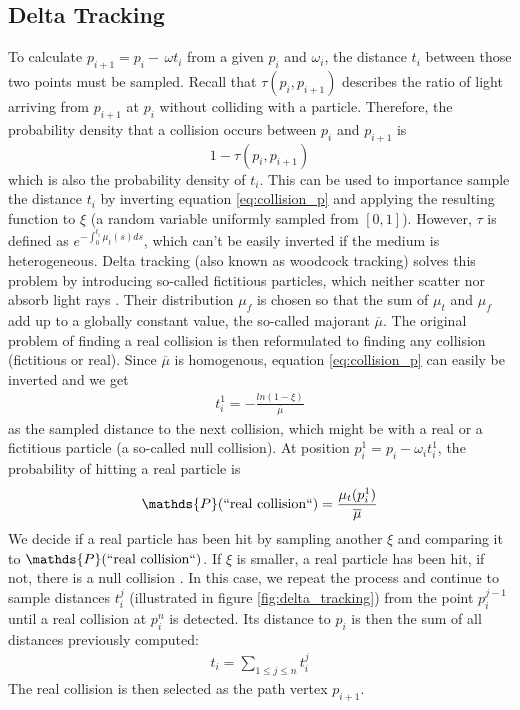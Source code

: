 \subsection{Delta Tracking}
To calculate $p_{i+1} = p_i - \,\omega t_i$ from a given $p_i$ and $\omega_i$, the distance $t_i$ between those two points must be sampled. Recall that $\tau(p_i, p_{i+1})$ describes the ratio of light arriving from $p_{i+1}$ at $p_i$ without colliding with a particle. Therefore, the probability density \cite{wiki:Probability_density_function} that a collision occurs between $p_i$ and $p_{i+1}$ is 
\begin{equation} \label{eq:collision_p}
1 - \tau({p_i, p_{i+1}})
\end{equation}
which is also the probability density of $t_i$.
This can be used to importance sample \cite{osti_4167844} the distance $t_i$ by inverting equation \ref{eq:collision_p} and applying the resulting function to $\xi$  (a random variable uniformly sampled from $[0,1]$). However, $\tau$ is defined as $e^{-\int_{0}^{t_i}\mu_t(s)ds}$, which can't be easily inverted if the medium is heterogeneous.
Delta tracking (also known as woodcock tracking) solves this problem by introducing so-called fictitious particles, which neither scatter nor absorb light rays \cite{10.1145/2661229.2661292}. Their distribution $\mu_f$ is chosen so that the sum of $\mu_t$ and $\mu_f$ add up to a globally constant value, the so-called majorant $\overline{\mu}$.
The original problem of finding a real collision is then reformulated to finding any collision (fictitious or real).
Since $\overline{\mu}$ is homogenous, equation \ref{eq:collision_p} can easily be inverted \cite{morgan-delta-tracking} and we get
\begin{align*}
t_i^1 = - \frac{ln(1 - \xi)}{\overline{\mu}}
\end{align*} 
as the sampled distance to the next collision, which might be with a real or a fictitious particle (a so-called null collision).
At position $p_i^1 = p_i - \omega_i t_i^1$, the probability of hitting a real particle is 
\begin{align*}
\mathds{P}(``\text{real collision}``) = \frac{\mu_t(p_i^1)}{\overline{\mu}}
\end{align*}
We decide if a real particle has been hit by sampling another $\xi$ and comparing it to $\mathds{P}(``\text{real collision}``)$. If $\xi$ is smaller, a real particle has been hit, if not, there is a null collision \cite{10.1145/2661229.2661292}.
In this case, we repeat the process and continue to sample distances $t_i^j$ (illustrated in figure \ref{fig:delta_tracking}) from the point $p_i ^{j-1}$ until a real collision at $p_i^n$ is detected. Its distance to $p_i$ is then the sum of all distances previously computed:
\begin{align*}
t_i = \sum_{1 \le j \le n} t_i^j
\end{align*}
The real collision is then selected as the path vertex $p_{i+1}$.


